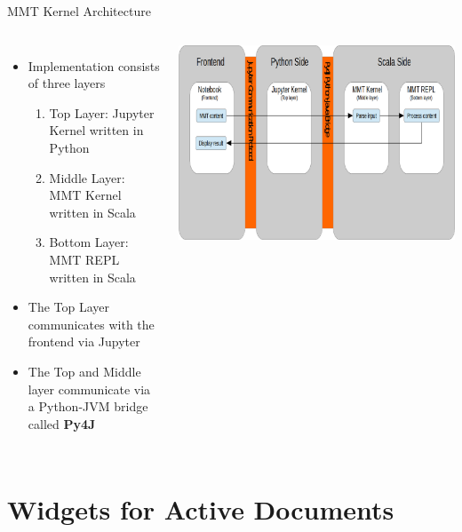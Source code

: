 \documentclass{beamer}
\begin{document}
    \begin{frame}{MMT Kernel Architecture}
        \begin{columns}
            \begin{itemize}
                \item Implementation consists of three layers
                \begin{enumerate}
                    \item Top Layer: Jupyter Kernel written in Python
                    \item Middle Layer: MMT Kernel written in Scala
                    \item Bottom Layer: MMT REPL written in Scala
                \end{enumerate}
                \item The Top Layer communicates with the frontend via Jupyter
                \item The Top and Middle layer communicate via a Python-JVM bridge called \textbf{Py4J}
            \end{itemize}
            \centering
            \includegraphics[scale=0.2]{images/eval}
        \end{columns}
    \end{frame}

    \section{Widgets for Active Documents}
\end{document}
